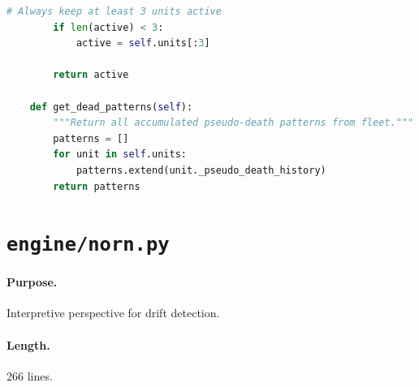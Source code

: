\begin{lstlisting}[language=Python,basicstyle=\ttfamily\scriptsize,frame=single,breaklines=true]
        # Always keep at least 3 units active
        if len(active) < 3:
            active = self.units[:3]

        return active

    def get_dead_patterns(self):
        """Return all accumulated pseudo-death patterns from fleet."""
        patterns = []
        for unit in self.units:
            patterns.extend(unit._pseudo_death_history)
        return patterns

\end{lstlisting}

\section{\texttt{engine/norn.py}}
\label{app:code:engine-norn-py}

\paragraph{Purpose.} Interpretive perspective for drift detection.

\paragraph{Length.} 266 lines.

